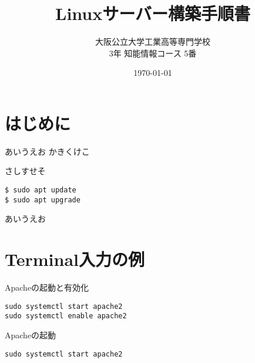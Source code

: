 \documentclass[a4paper, 11pt, dvipdfmx]{jsarticle}
\begin{document}
\title{Linuxサーバー構築手順書}
\author{大阪公立大学工業高等専門学校\\
3年 知能情報コース 5番\\}
\date{\today}
\maketitle\thispagestyle{empty}

\newpage
\setcounter{section}{0}

\section{はじめに}
あいうえお
かきくけこ

さしすせそ
  \begin{commandbox}{}
    \verb|$ sudo apt update|\\
    \verb|$ sudo apt upgrade|
  \end{commandbox}

  \begin{tcolorbox}[additionalstyle]
    あいうえお
  \end{tcolorbox}

\section{Terminal入力の例}
  \begin{commandbox}{Apacheの起動と有効化}
\begin{lstlisting}
sudo systemctl start apache2
sudo systemctl enable apache2
\end{lstlisting}
  \end{commandbox}

  \begin{commandbox}{Apacheの起動}
\begin{lstlisting}
sudo systemctl start apache2
\end{lstlisting}
  \end{commandbox}
\end{document}
